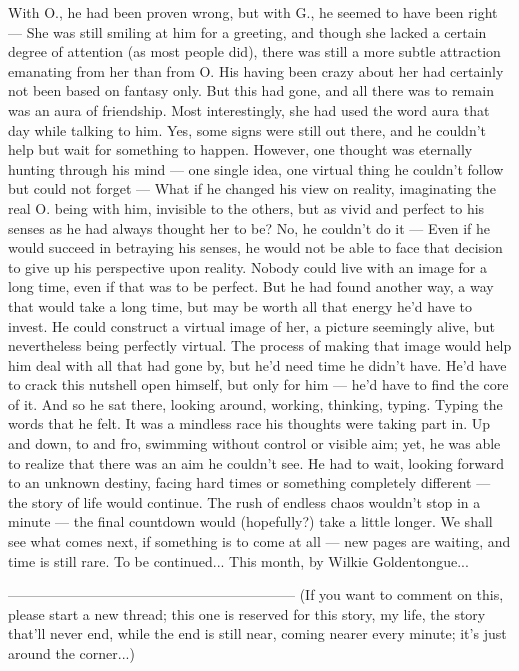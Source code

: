 With O., he had been proven wrong, but with G., he seemed to have been right --- She was still smiling at him for a greeting, and though she lacked a certain degree of attention (as most people did), there was still a more subtle attraction emanating from her than from O. His having been crazy about her had certainly not been based on fantasy only. But this had gone, and all there was to remain was an aura of friendship. Most interestingly, she had used the word aura that day while talking to him. 
Yes, some signs were still out there, and he couldn't help but wait for something to happen. 
However, one thought was eternally hunting through his mind --- one single idea, one virtual thing he couldn't follow but could not forget --- What if he changed his view on reality, imaginating the real O. being with him, invisible to the others, but as vivid and perfect to his senses as he had always thought her to be? 
No, he couldn't do it --- Even if he would succeed in betraying his senses, he would not be able to face that decision to give up his perspective upon reality. Nobody could live with an image for a long time, even if that was to be perfect. 
But he had found another way, a way that would take a long time, but may be worth all that energy he'd have to invest. He could construct a virtual image of her, a picture seemingly alive, but nevertheless being perfectly virtual. The process of making that image would help him deal with all that had gone by, but he'd need time he didn't have. 
He'd have to crack this nutshell open himself, but only for him --- he'd have to find the core of it. 
And so he sat there, looking around, working, thinking, typing. Typing the words that he felt. 
It was a mindless race his thoughts were taking part in. Up and down, to and fro, swimming without control or visible aim; yet, he was able to realize that there was an aim he couldn't see. 
He had to wait, looking forward to an unknown destiny, facing hard times or something completely different --- the story of life would continue. 
The rush of endless chaos wouldn't stop in a minute --- the final countdown would (hopefully?) take a little longer. 
We shall see what comes next, if something is to come at all --- new pages are waiting, and time is still rare. 
To be continued...
This month, by Wilkie Goldentongue...

--------------------------------------------------------------
(If you want to comment on this, please start a new thread; this one is reserved for this story, my life, the story that'll never end, while the end is still near, coming nearer every minute; it's just around the corner...)

